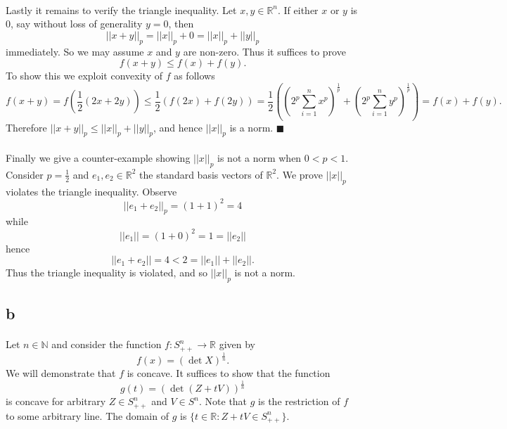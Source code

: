 \documentclass[letterpaper,12pt,oneside,onecolumn]{article}
\newcommand{\N}{\mathbb{N}} \newcommand{\R}{\mathbb{R}}
\begin{document}
\paragraph{}
Lastly it remains to verify the triangle inequality. Let $x, y \in \R^n$. If either $x$ or $y$ is $0$, say without loss of generality $y=0$, then 
$$||x + y||_p = ||x||_p + 0 = ||x||_p + ||y||_p$$
immediately. So we may assume $x$ and $y$ are non-zero. Thus it suffices to prove
$$f(x+y) \leq f(x) + f(y).$$
To show this we exploit convexity of $f$ as follows
$$f(x+y) = f(\frac{1}{2}(2x+2y)) \leq \frac{1}{2}(f(2x) + f(2y)) = \frac{1}{2} ((2^p\sum_{i=1}^n x^p)^\frac{1}{p} +(2^p\sum_{i=1}^n y^p)^\frac{1}{p}) = f(x) + f(y).$$
Therefore $||x + y||_p \leq ||x||_p + ||y||_p$, and hence $||x||_p$ is a norm. $\blacksquare$
\paragraph{}
Finally we give a counter-example showing $||x||_p$ is not a norm when $0 < p < 1$. Consider $p =\frac{1}{2}$ and $e_1, e_2 \in \R^2$ the standard basis vectors of $\R^2$. We prove $||x||_p$ violates the triangle inequality. Observe
$$||e_1 + e_2 ||_p = (1 + 1)^2 = 4$$
while 
$$||e_1|| = (1+0)^2 = 1 = ||e_2||$$
hence 
$$||e_1 + e_2||  = 4 < 2 = ||e_1|| + ||e_2||.$$
Thus the triangle inequality is violated, and so $||x||_p$ is not a norm.
\subsection{b}
\paragraph{}
Let $n \in \N$ and consider the function $f: S^n_{++} \rightarrow \R$ given by
$$f(x) = (\det X)^\frac{1}{n}.$$
We will demonstrate that $f$ is concave. It suffices to show that the function 
$$g(t) = (\det (Z + t V))^\frac{1}{n} $$
is concave for arbitrary $Z \in S^n_{++}$ and $V \in S^n$. Note that $g$ is the restriction of $f$ to some arbitrary line. The domain of $g$ is $\{t \in \R: Z + tV \in S^n_{++}\}$.
\end{document}
